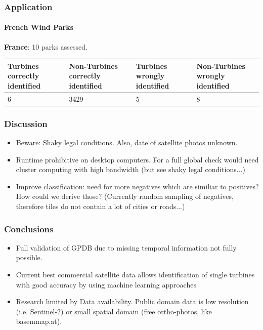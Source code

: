 \documentclass[color=usenames,dvipsnames]{beamer}
\begin{document}
\begin{frame}
\frametitle{Application}
\framesubtitle{French Wind Parks}

\textbf{France}: 10 parks assessed. 

\begin{table}[]
	\begin{tabularx}{\textwidth}{XXXX}
	
		Turbines correctly identified  &Non-Turbines correctly identified  &Turbines wrongly identified  &Non-Turbines wrongly identified  \\
			\hline
		6  &3429  &5  &8  \\
	\end{tabularx}
\end{table}

\end{frame}

\begin{frame}
\frametitle{Discussion}
\begin{itemize}
\item Beware: Shaky legal conditions. Also, date of satellite photos unknown.
 \item Runtime prohibitive on desktop computers. For a full global check would need cluster computing with high bandwidth (but see shaky legal conditions...) 
 \item Improve classification: need for more negatives which are similiar to positives? How could we derive those? (Currently random sampling of negatives, therefore tiles do not contain a lot of cities or roads...)
\end{itemize}

\end{frame}




\begin{frame}
\frametitle{Conclusions}
\begin{itemize}
 \item Full validation of GPDB due to missing temporal information not fully possible. 
 \item Current best commercial satellite data allows identification of single turbines with good accuracy by using machine learning approaches
 \item Research limited by Data availability. Public domain data is low resolution (i.e. Sentinel-2) or small spatial domain (free ortho-photos, like basemmap.at).
\end{itemize}

\end{frame}
\end{document}
